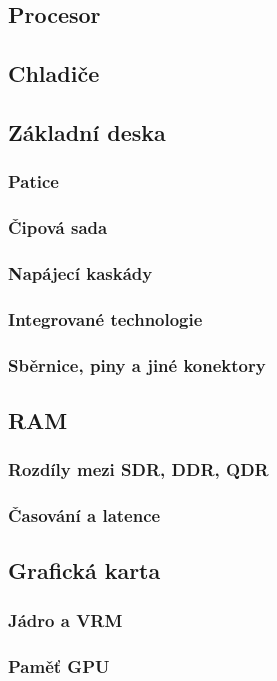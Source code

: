 \documentclass[a4paper]{article}
\begin{document}
    \subsection{Procesor}
    \subsection{Chladiče}
    \subsection{Základní deska}
        \subsubsection{Patice}
        \subsubsection{Čipová sada}
        \subsubsection{Napájecí kaskády}
        \subsubsection{Integrované technologie}
        \subsubsection{Sběrnice, piny a jiné konektory}
    \subsection{RAM}
        \subsubsection{Rozdíly mezi SDR, DDR, QDR}
        \subsubsection{Časování a latence}
    \subsection{Grafická karta}
        \subsubsection{Jádro a VRM}
        \subsubsection{Paměť GPU}
\end{document}
